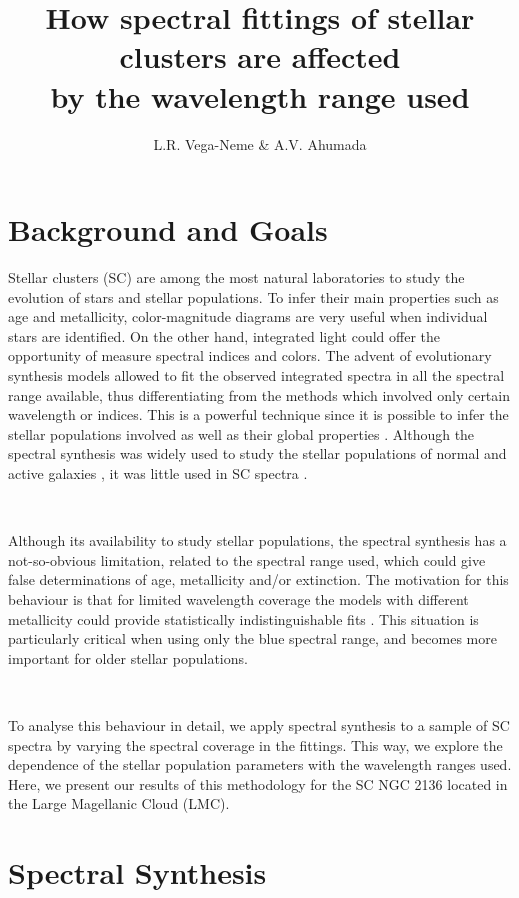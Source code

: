 \documentclass[baaa]{baaa}
\title{How spectral fittings of stellar clusters are affected \\
by the wavelength range used}
\author{
L.R. Vega-Neme\inst{1,2} \& A.V. Ahumada\inst{1,3}
}
\institute{
Observatorio Astron\'omico de C\'ordoba, UNC, Argentina
\and
Instituto de Astronom\'ia Te\'orica y Experimental, CONICET--UNC, Argentina
\and
Consejo Nacional de Investigaciones Cient\'ificas y T\'ecnicas, Argentina
}
\begin{document}
\maketitle

\section{Background and Goals}

Stellar clusters (SC) are among the most natural laboratories to study the evolution of stars and stellar populations. To infer their main properties such as age and metallicity, color-magnitude diagrams are very useful when individual stars are identified. On the other hand, integrated light could offer the opportunity of measure spectral indices and colors. The advent of evolutionary synthesis models allowed to fit the observed integrated spectra in all the spectral range available, thus differentiating from the methods which involved only certain wavelength or indices. This is a powerful technique since it is possible to infer the stellar populations involved as well as their global properties \citep{Cid}. Although the spectral synthesis was widely used to study the stellar populations of normal and active galaxies \citep{Tesis}, it was little used in SC spectra \citep{Andrea}.

\

Although its availability to study stellar populations, the spectral synthesis has a not-so-obvious limitation, related to the spectral range used, which could give false determinations of age, metallicity and/or extinction. The motivation for this behaviour is that for limited wavelength coverage the models with different metallicity could provide statistically indistinguishable fits \citep{CR2010a}. This situation is particularly critical when using only the blue spectral range, and becomes more important for older stellar populations.

\

To analyse this behaviour in detail, we apply spectral synthesis to a sample of SC spectra by varying the spectral coverage in the fittings. This way, we explore the dependence of the stellar population parameters with the wavelength ranges used. Here, we present our results of this methodology for the SC NGC 2136 located in the Large Magellanic Cloud (LMC).

\section{Spectral Synthesis}
\end{document}
